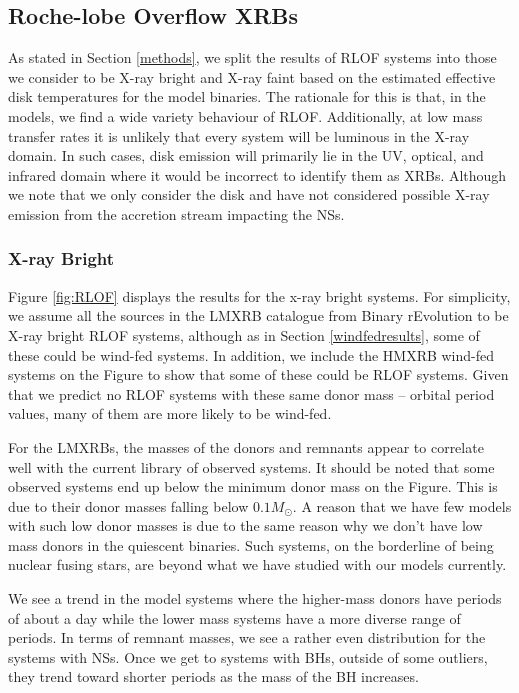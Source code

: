 \documentclass{pas}
\begin{document}
\subsection{Roche-lobe Overflow XRBs}\label{RLOFResults}

As stated in Section \ref{methods}, we split the results of RLOF systems into those we consider to be X-ray bright and X-ray faint based on the estimated effective disk temperatures for the model binaries. The rationale for this is that, in the models, we find a wide variety behaviour of RLOF. Additionally, at low mass transfer rates it is unlikely that every system will be luminous in the X-ray domain. In such cases, disk emission will primarily lie in the UV, optical, and infrared domain where it would be incorrect to identify them as XRBs. Although we note that we only consider the disk and have not considered possible X-ray emission from the accretion stream impacting the NSs.

\subsubsection{X-ray Bright}\label{xraybrightresults}
Figure \ref{fig:RLOF} displays the results for the x-ray bright systems. For simplicity, we assume all the sources in the LMXRB catalogue from Binary rEvolution to be X-ray bright RLOF systems, although as in Section \ref{windfedresults}, some of these could be wind-fed systems. In addition, we include the HMXRB wind-fed systems on the Figure to show that some of these could be RLOF systems. Given that we predict no RLOF systems with these same donor mass -- orbital period values, many of them are more likely to be wind-fed.

For the LMXRBs, the masses of the donors and remnants appear to correlate well with the current library of observed systems. It should be noted that some observed systems end up below the minimum donor mass on the Figure. This is due to their donor masses falling below $0.1M_{\odot}$. A reason that we have few models with such low donor masses is due to the same reason why we don't have low mass donors in the quiescent binaries. Such systems, on the borderline of being nuclear fusing stars, are beyond what we have studied with our models currently.

We see a trend in the model systems where the higher-mass donors have periods of about a day while the lower mass systems have a more diverse range of periods. In terms of remnant masses, we see a rather even distribution for the systems with NSs. Once we get to systems with BHs, outside of some outliers, they trend toward shorter periods as the mass of the BH increases. 
\end{document}
